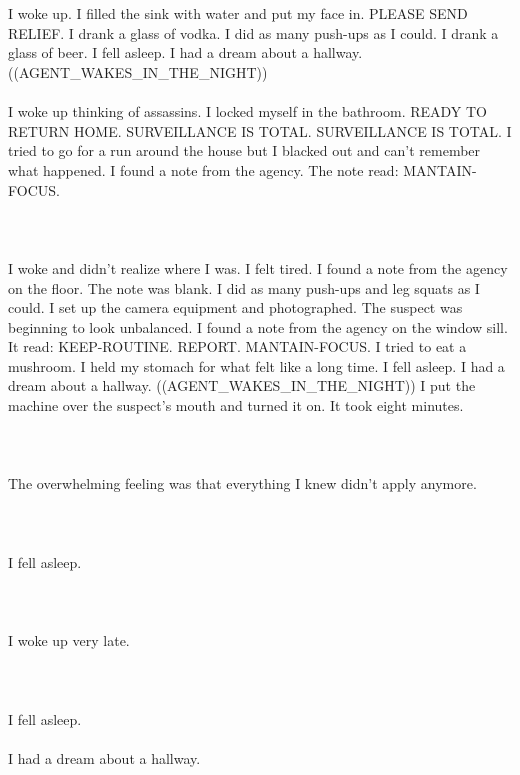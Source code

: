 \documentclass{article}
\begin{document}
    \section{}
    I woke up. I filled the sink with water and put my face in. PLEASE SEND RELIEF. I drank a glass of vodka. I did as many push-ups as I could. I drank a glass of beer. I fell asleep. I had a dream about a hallway. ((AGENT_WAKES_IN_THE_NIGHT)) \\\\I woke up thinking of assassins. I locked myself in the bathroom. READY TO RETURN HOME. SURVEILLANCE IS TOTAL. SURVEILLANCE IS TOTAL. I tried to go for a run around the house but I blacked out and can't remember what happened. I found a note from the agency. The note read: MANTAIN-FOCUS. \\\\
    \newpage
    
    \section{}
    I woke and didn't realize where I was. I felt tired. I found a note from the agency on the floor. The note was blank. I did as many push-ups and leg squats as I could. I set up the camera equipment and photographed. The suspect was beginning to look unbalanced. I found a note from the agency on the window sill. It read: KEEP-ROUTINE. REPORT. MANTAIN-FOCUS. I tried to eat a mushroom. I held my stomach for what felt like a long time. I fell asleep. I had a dream about a hallway. ((AGENT_WAKES_IN_THE_NIGHT)) I put the machine over the suspect's mouth and turned it on. It took eight minutes. \\\\
    \newpage
    
    \section{}
    The overwhelming feeling was that everything I knew didn't apply anymore.\\\\ 
    \newpage
    
    \section{}
    I fell asleep.\\\\ 
    \newpage
    
    \section{}
    I woke up very late.\\\\ 
    \newpage
    
    \section{}
    I fell asleep.\\\\I had a dream about a hallway.\\\\ 
    \newpage
    
    
\end{document}
